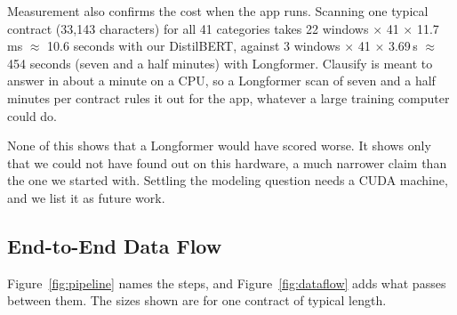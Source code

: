 Measurement also confirms the cost when the app runs. Scanning one typical contract (33{,}143 characters) for all 41 categories takes 22 windows $\times$ 41 $\times$ 11.7\,ms $\approx$ 10.6 seconds with our DistilBERT, against 3 windows $\times$ 41 $\times$ 3.69\,s $\approx$ 454 seconds (seven and a half minutes) with Longformer. Clausify is meant to answer in about a minute on a CPU, so a Longformer scan of seven and a half minutes per contract rules it out for the app, whatever a large training computer could do.

None of this shows that a Longformer would have scored worse. It shows only that we could not have found out on this hardware, a much narrower claim than the one we started with. Settling the modeling question needs a CUDA machine, and we list it as future work.
\subsection{End-to-End Data Flow}
Figure~\ref{fig:pipeline} names the steps, and Figure~\ref{fig:dataflow} adds what passes between them. The sizes shown are for one contract of typical length.

